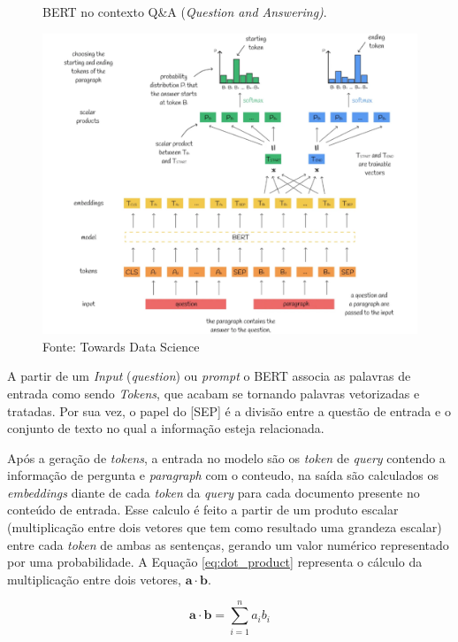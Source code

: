 \begin{figure}[H]
    \centering
    \caption{BERT no contexto Q\&A (\textit{Question and Answering)}.}
    \includegraphics[width=\linewidth]{img/BERT/bert5.png}
    \caption*{Fonte: Towards Data Science \cite{Rani2018}}
    \label{fig:bert5}
\end{figure}

A partir de um \textit{Input} (\textit{question}) ou \textit{prompt} o BERT associa as palavras de entrada como sendo \textit{Tokens}, que acabam se tornando palavras vetorizadas e tratadas. Por sua vez, o papel do [SEP] é a divisão entre a questão de entrada e o conjunto de texto no qual a informação esteja relacionada.

Após a geração de \textit{tokens}, a entrada no modelo são os \textit{token} de \textit{query} contendo a informação de pergunta e \textit{paragraph} com o conteudo, na saída são calculados os \textit{embeddings} diante de cada \textit{token} da \textit{query} para cada documento presente no conteúdo de entrada. Esse calculo é feito a partir de um produto escalar (multiplicação entre dois vetores que tem como resultado uma grandeza escalar) entre cada \textit{token} de ambas as sentenças, gerando um valor numérico representado por uma probabilidade. A Equação \ref{eq:dot_product} representa o cálculo da multiplicação entre dois vetores, \cite{Bechtel1971} \( \mathbf{a} \cdot \mathbf{b} \).

\begin{equation}
    \label{eq:dot_product}
    \mathbf{a} \cdot \mathbf{b} = \sum_{i=1}^{n} a_i b_i
\end{equation}

